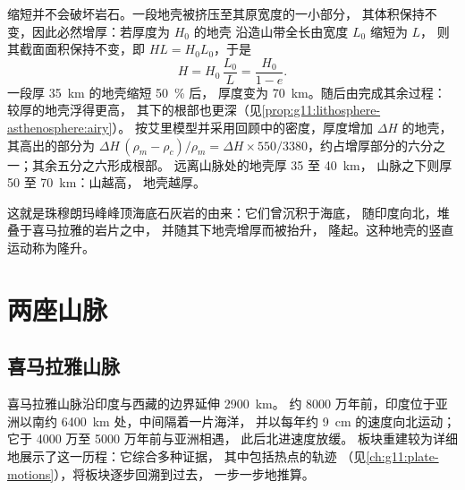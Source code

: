 缩短并不会破坏岩石。一段地壳被挤压至其原宽度的一小部分，
其体积保持不变，因此必然增厚：若厚度为 $H_0$ 的地壳
沿造山带全长由宽度 $L_0$ 缩短为 $L$，
则其截面面积保持不变，即 $H L = H_0 L_0$，于是
\[
  H = H_0\,\frac{L_0}{L} = \frac{H_0}{1 - e}.
\]
一段厚 \qty{35}{km} 的地壳缩短 \qty{50}{\percent} 后，
厚度变为 \qty{70}{km}。随后由完成其余过程：较厚的地壳浮得更高，
其下的根部也更深（见\cref{prop:g11:lithosphere-asthenosphere:airy}）。
按艾里模型并采用回顾中的密度，厚度增加 $\Delta H$ 的地壳，
其高出的部分为 $\Delta H\,(\rho_m - \rho_c)/\rho_m = \Delta H
\times 550/3380$，约占增厚部分的六分之一；其余五分之六形成根部。
远离山脉处的地壳厚 \num{35} 至 \qty{40}{km}，
山脉之下则厚 50 至 \qty{70}{km}：山越高，
地壳越厚。

这就是珠穆朗玛峰峰顶海底石灰岩的由来：它们曾沉积于海底，
随印度向北，堆叠于喜马拉雅的岩片之中，
并随其下地壳增厚而被抬升，
隆起。这种地壳的竖直运动称为隆升。

\section{两座山脉}

\subsection{喜马拉雅山脉}

喜马拉雅山脉沿印度与西藏的边界延伸 \qty{2900}{km}。
约 8000 万年前，印度位于亚洲以南约 \qty{6400}{km} 处，中间隔着一片海洋，
并以每年约 \qty{9}{cm} 的速度向北运动；它于 4000 万至 5000 万年前与亚洲相遇，
此后北进速度放缓。
板块重建较为详细地展示了这一历程：它综合多种证据，
其中包括热点的轨迹
（见\cref{ch:g11:plate-motions}），将板块逐步回溯到过去，
一步一步地推算。

